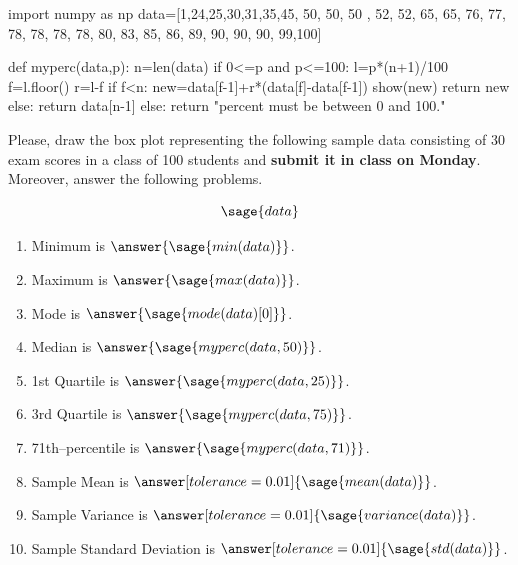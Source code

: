 \documentclass{ximera}
\begin{document}
\begin{problem}
\begin{sagesilent}
import numpy as np
data=[1,24,25,30,31,35,45, 50, 50, 50 , 52, 52, 65, 65, 76, 77, 78, 78, 78, 78, 80, 83, 85, 86, 89, 90, 90, 90, 99,100]

def myperc(data,p):
    n=len(data)
    if 0<=p and p<=100:
        l=p*(n+1)/100
        f=l.floor()
        r=l-f
        if f<n:
            new=data[f-1]+r*(data[f]-data[f-1])
            show(new)
            return new
        else:
            return data[n-1]
    else:
        return "percent must be between 0 and 100."
\end{sagesilent}
Please, draw the box plot representing the following sample data consisting of 30 exam scores in a class of 100 students and \textbf{submit it in class on Monday}. Moreover, answer the following problems.

$$\sage{data}$$

\begin{enumerate}
    \item Minimum is $\answer{\sage{min(data)}}$.
    \item Maximum is $\answer{\sage{max(data)}}$.
    \item Mode is $\answer{\sage{mode(data)[0]}}$.
    \item Median is $\answer{\sage{myperc(data,50)}}$.
    \item 1st Quartile is $\answer{\sage{myperc(data,25)}}$.
    \item 3rd Quartile is $\answer{\sage{myperc(data,75)}}$.
    \item 71th--percentile is $\answer{\sage{myperc(data,71)}}$.
    \item Sample Mean is $\answer[tolerance=0.01]{\sage{mean(data)}}$.
    \item Sample Variance is $\answer[tolerance=0.01]{\sage{variance(data)}}$.
    \item Sample Standard Deviation is $\answer[tolerance=0.01]{\sage{std(data)}}$.
\end{enumerate}
\end{problem}
\end{document}
